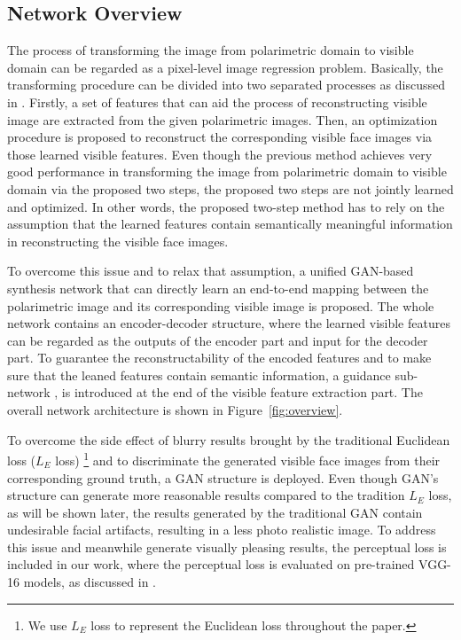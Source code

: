 \documentclass[10pt,twocolumn,letterpaper]{article}
\begin{document}
 
 
\subsection{Network Overview}
The process of transforming  the image from polarimetric domain to visible domain can be regarded as a pixel-level image regression problem.  Basically, the transforming procedure can be divided into two separated processes as discussed in \cite{btas_2016}. Firstly,  a set of features that can aid the process of reconstructing visible image are extracted from the given polarimetric images.  Then, an optimization procedure is proposed to reconstruct the corresponding visible face images via those learned visible features.  Even though the previous method \cite{btas_2016} achieves very good performance in transforming the image from polarimetric domain to visible domain via the proposed two steps, the proposed two steps are not jointly learned and optimized.  In other words, the proposed two-step method has to rely on the assumption that the learned features contain semantically meaningful information in reconstructing the visible face images. 

To overcome this issue and to relax that assumption, a unified GAN-based synthesis network that can directly learn an end-to-end mapping between the polarimetric image and its corresponding visible image is proposed.  The whole network contains an encoder-decoder structure, where the learned visible features can be regarded as the outputs of the encoder part and input for the decoder part. To guarantee the reconstructability  of the  encoded features and to make sure that the leaned features contain semantic information, a guidance sub-network \cite{deep_supervision}, is introduced at the end of the visible feature extraction part.  The overall network architecture is shown in Figure~\ref{fig:overview}. 

To overcome the side effect of blurry results brought by the traditional Euclidean loss ($L_E$ loss) \footnote{We use $L_E$ loss to represent the Euclidean loss throughout the paper. } and to discriminate the generated visible face images from their corresponding ground truth, a GAN structure is deployed. Even though GAN's structure can generate more reasonable results compared to the tradition $L_E$ loss, as will be shown later, the results generated by the traditional GAN contain undesirable facial artifacts, resulting in a less photo realistic image. To address this issue and meanwhile generate visually pleasing results, the  perceptual loss is included in our work, where the perceptual loss is evaluated on pre-trained VGG-16 models, as discussed in \cite{perceptual_loss,hang_style}. 
\end{document}
